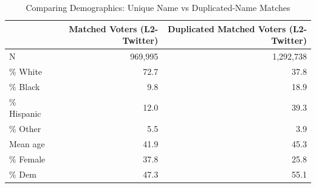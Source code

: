 \begin{table}[!h]
\centering
\caption{\label{tab:tab:name_uniqueness_demographics}Comparing Demographics: Unique Name vs Duplicated-Name Matches}
\centering
\begin{tabular}[t]{lrr}
\toprule
 & Matched Voters (L2-Twitter) & Duplicated Matched Voters (L2-Twitter)\\
\midrule
N & 969,995 & 1,292,738\\
\% White & 72.7 & 37.8\\
\% Black & 9.8 & 18.9\\
\% Hispanic & 12.0 & 39.3\\
\% Other & 5.5 & 3.9\\
\addlinespace
Mean age & 41.9 & 45.3\\
\% Female & 37.8 & 25.8\\
\% Dem & 47.3 & 55.1\\
\bottomrule
\end{tabular}
\end{table}
